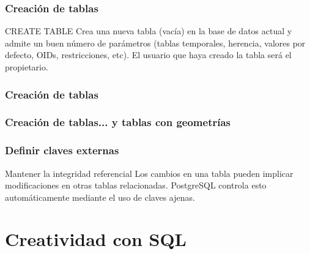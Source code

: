 \documentclass{classes/beamer_GeomaticaUA}
\begin{document}
\begin{frame}[fragile]
\frametitle{Creación de tablas}

\begin{block}{CREATE TABLE}
Crea una nueva tabla (vacía) en la base de datos actual y admite un buen número de parámetros (tablas temporales, herencia, valores por defecto, OIDs, restricciones, etc). El usuario que haya creado la tabla será el propietario.
\end{block}



\end{frame}


\begin{frame}[fragile]
\frametitle{Creación de tablas}


\end{frame}


\begin{frame}[fragile]
\frametitle{Creación de tablas... y tablas con geometrías}






\end{frame}

\begin{frame}[fragile]
\frametitle{Definir claves externas}

\begin{block}{Mantener la integridad referencial}
Los cambios en una tabla pueden implicar modificaciones en otras tablas relacionadas. PostgreSQL controla esto automáticamente mediante el uso de claves ajenas.
\end{block}



\end{frame}


\section[Ejercicios]{Creatividad con SQL}
\end{document}
